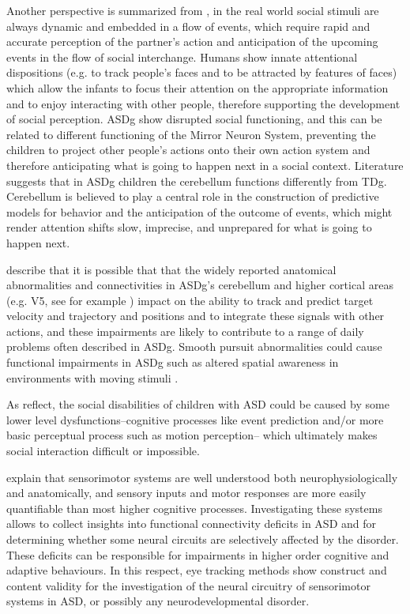 Another perspective is summarized from \cite{vonhofsten2009lookingevents}, in the real world social stimuli are always dynamic and embedded in a flow of events, which require rapid and accurate perception of the partner’s action and anticipation of the upcoming events in the flow of social interchange. Humans show innate attentional dispositions (e.g. to track people’s faces and to be attracted by features of faces) which allow the infants to focus their attention on the appropriate information and to enjoy interacting with other people, therefore supporting the development of social perception. ASDg show disrupted social functioning, and this can be related to different functioning of the Mirror Neuron System, preventing the children to project other people’s actions onto their own action system and therefore anticipating what is going to happen next in a social context. Literature suggests that in ASDg children the cerebellum functions differently from TDg. Cerebellum is believed to play a central role in the construction of predictive models for behavior and the anticipation of the outcome of events, which might render attention shifts slow, imprecise, and unprepared for what is going to happen next.

\cite{johnson2016review} describe that it is possible that that the widely reported anatomical abnormalities and connectivities in ASDg’s cerebellum and higher cortical areas (e.g. V5, see for example \citealp{takarae2014motionprocessing}) impact on the ability to track and predict target velocity and trajectory and positions and to integrate these signals with other actions, and these impairments are likely to contribute to a range of daily problems often described in ASDg. Smooth pursuit abnormalities could cause functional impairments in ASDg such as altered spatial awareness in environments with moving stimuli \citep{wilkes2015oculomotor}. 

As \cite{vonhofsten2009lookingevents} reflect, the social disabilities of children with ASD could be caused by some lower level dysfunctions–cognitive processes like event prediction and/or more basic perceptual process such as motion perception– which ultimately makes social interaction difficult or impossible.

\cite{takarae2004smoothpursuit} explain that sensorimotor systems are well understood both neurophysiologically and anatomically, and sensory inputs and motor responses are more easily quantifiable than most higher cognitive processes. Investigating these systems allows to collect insights into functional connectivity deficits in ASD and for determining whether some neural circuits are selectively affected by the disorder. These deficits can be responsible for impairments in higher order cognitive and adaptive behaviours. In this respect, eye tracking methods show construct and content validity for the investigation of the neural circuitry of sensorimotor systems in ASD, or possibly any neurodevelopmental disorder.

